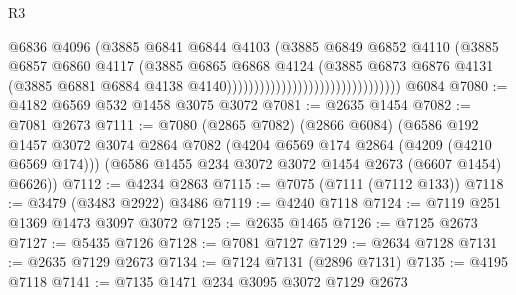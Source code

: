 \begin{lexlean}{R3}
\begin{coremodule}
                                                        @6836
                                                        @4096
                                                        (@3885
                                                          @6841
                                                          @6844
                                                          @4103
                                                          (@3885
                                                            @6849
                                                            @6852
                                                            @4110
                                                            (@3885
                                                              @6857
                                                              @6860
                                                              @4117
                                                              (@3885
                                                                @6865
                                                                @6868
                                                                @4124
                                                                (@3885
                                                                  @6873
                                                                  @6876
                                                                  @4131
                                                                  (@3885
                                                                    @6881
                                                                    @6884
                                                                    @4138
                                                                    @4140))))))))))))))))))))))))))))))))
    @6084
@7080 := @4182 @6569 @532 @1458 @3075 @3072
@7081 := @2635 @1454
@7082 := @7081 @2673
@7111 := @7080
    (@2865 @7082)
    (@2866 @6084)
    (@6586
      @192
      @1457
      @3072
      @3074
      @2864
      @7082
      (@4204 @6569 @174 @2864 (@4209 (@4210 @6569 @174)))
      (@6586 @1455 @234 @3072 @3072 @1454 @2673 (@6607 @1454) @6626))
@7112 := @4234 @2863
@7115 := @7075 (@7111 (@7112 @133))
@7118 := @3479 (@3483 @2922) @3486
@7119 := @4240 @7118
@7124 := @7119 @251 @1369 @1473 @3097 @3072
@7125 := @2635 @1465
@7126 := @7125 @2673
@7127 := @5435 @7126
@7128 := @7081 @7127
@7129 := @2634 @7128
@7131 := @2635 @7129 @2673
@7134 := @7124 @7131 (@2896 @7131)
@7135 := @4195 @7118
@7141 := @7135 @1471 @234 @3095 @3072 @7129 @2673

\end{coremodule}
\end{lexlean}

